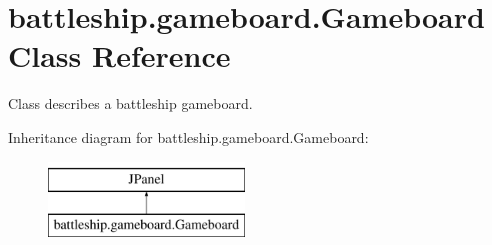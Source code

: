 \hypertarget{classbattleship_1_1gameboard_1_1Gameboard}{}\section{battleship.\+gameboard.\+Gameboard Class Reference}
\label{classbattleship_1_1gameboard_1_1Gameboard}


Class describes a battleship gameboard.  


Inheritance diagram for battleship.\+gameboard.\+Gameboard\+:\begin{figure}[H]
\begin{center}
\leavevmode
\includegraphics[height=2.000000cm]{classbattleship_1_1gameboard_1_1Gameboard}
\end{center}
\end{figure}
